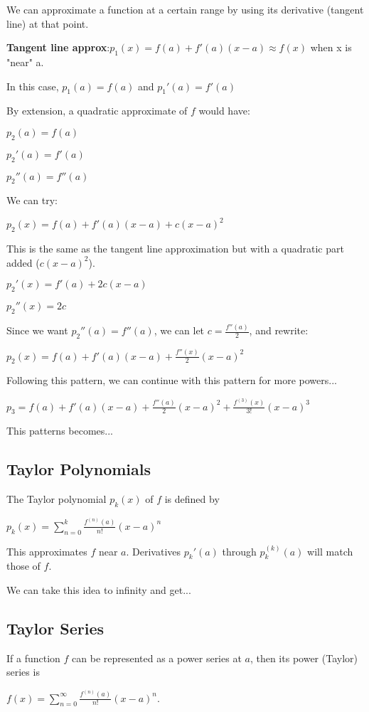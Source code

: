 \documentclass{article}
\begin{document}
We can approximate a function at a certain range by using its derivative (tangent line) at that point.

\textbf{Tangent line approx}:$p_1(x) = f(a) + f'(a)(x-a) \approx f(x)$ when x is "near" a.

In this case, $p_1(a) = f(a)$ and $p_1'(a) = f'(a)$

By extension, a quadratic approximate of $f$ would have:

$p_2(a) = f(a)$

$p_2'(a) = f'(a)$

$p_2''(a) = f''(a)$

We can try: 

$p_2(x) = f(a) + f'(a)(x-a) + c(x-a)^2$

This is the same as the tangent line approximation but with a quadratic part added ($c(x-a)^2$).

$p_2'(x) = f'(a) + 2c(x-a)$

$p_2''(x) = 2c$

Since we want $p_2''(a) = f''(a)$, we can let $c = \frac{f''(a)}{2}$, and rewrite:

$p_2(x) = f(a) + f'(a)(x-a) + \frac{f''(x)}{2} (x-a)^2$

Following this pattern, we can continue with this pattern for more powers...

$p_3 = f(a) + f'(a)(x-a) + \frac{f''(a)}{2} (x-a)^2 + \frac{f^{(3)}(x)}{3!} (x-a)^3$

This patterns becomes...

\subsection{Taylor Polynomials}

The Taylor polynomial $p_k(x)$ of $f$ is defined by

$p_k(x) = \sum_{n=0}^{k} \frac{f^{(n)}(a)}{n!} (x-a)^n$

This approximates $f$ near $a$. Derivatives $p_k'(a)$ through $p_k^{(k)}(a)$ will match those of $f$.

We can take this idea to infinity and get...

\subsection{Taylor Series}

If a function $f$ can be represented as a power series at $a$, then its power (Taylor) series is 

$f(x) = \sum_{n=0}^{\infty} \frac{f^{(n)}(a)}{n!} (x-a)^n$.
\end{document}
